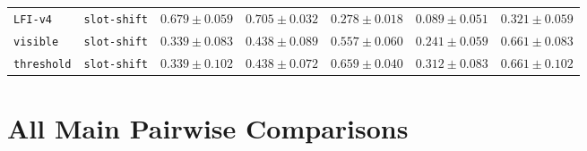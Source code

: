 \documentclass{article}
\begin{document}
\begin{center}
{\begin{tabular}{llccccc}
\texttt{LFI-v4} & \texttt{slot-shift} & $0.679 \pm 0.059$ & $0.705 \pm 0.032$ & $0.278 \pm 0.018$ & $0.089 \pm 0.051$ & $0.321 \pm 0.059$ \\
\texttt{visible} & \texttt{slot-shift} & $0.339 \pm 0.083$ & $0.438 \pm 0.089$ & $0.557 \pm 0.060$ & $0.241 \pm 0.059$ & $0.661 \pm 0.083$ \\
\texttt{threshold} & \texttt{slot-shift} & $0.339 \pm 0.102$ & $0.438 \pm 0.072$ & $0.659 \pm 0.040$ & $0.312 \pm 0.083$ & $0.661 \pm 0.102$ \\
\bottomrule
\end{tabular}%
}
\end{center}
\normalsize

\section{All Main Pairwise Comparisons}
\scriptsize
\setlength{\tabcolsep}{2pt}
\end{document}
